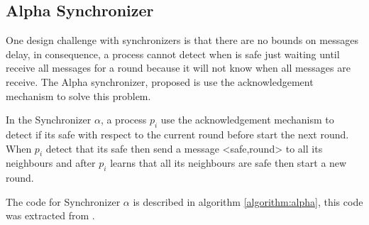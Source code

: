 \subsection{Alpha Synchronizer}

One design challenge with synchronizers is that there are no bounds on messages delay, in consequence, a process cannot detect when is safe just waiting until receive all messages for a round because it will not know when all messages are receive. The Alpha synchronizer, proposed is \cite{awerbuch1985complexity} use the acknowledgement mechanism to solve this problem. 

In the Synchronizer $\alpha$, a process $p_i$ use the acknowledgement mechanism to detect if its safe with respect to the current round before start the next round. When $p_i$ detect that its safe then send a message <safe,round> to all its neighbours and after $p_i$ learns that all its neighbours are safe then start a new round.

The code for Synchronizer $\alpha$ is described in algorithm \ref{algorithm:alpha}, this code was extracted from \cite{attiya2004distributed}. 



